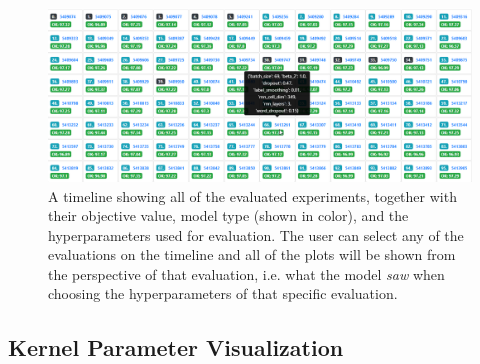 \begin{figure}
	\begin{center}
		\includegraphics[width=1.0\textwidth]{images/timeline-view.png}
		\caption{A timeline showing all of the evaluated experiments, together with their objective value, model type (shown in color), and the hyperparameters used for evaluation. The user can select any of the evaluations on the timeline and all of the plots will be shown from the perspective of that evaluation, i.e. what the model \emph{saw} when choosing the hyperparameters of that specific evaluation.}
	\end{center}
\end{figure}
\label{figure:timeline-view}

\subsection{Kernel Parameter Visualization}
\label{section:kernel-parameter-visualization}

